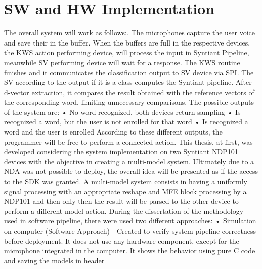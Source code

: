 \chapter{SW and HW Implementation}
\label{cha:software and hardware implementation}
The overall system will work as follows:. The microphones capture the user voice and save their in the buffer. When the buffers are full in the respective devices, the KWS action performing device, will process the input in Syntiant Pipeline, meanwhile SV performing device will wait for a response. The KWS routine finishes and it communicates the classification output to SV device via SPI. The SV according to the output if it is a class computes the Syntiant pipeline. After d-vector extraction, it compares the result obtained with the reference vectors of the corresponding word, limiting unnecessary comparisons.\newline\newline
The possible outputs of the system are:\newline
• No word recognized, both devices return sampling\newline
• Is recognized a word, but the user is not enrolled for that word\newline
• Is recognized a word and the user is enrolled\newline
According to these different outputs, the programmer will be free to perform a connected action.\newline
This thesis, at first, was developed considering the system implementation on two Syntiant NDP101 devices with the objective in creating a multi-model system. Ultimately due to a NDA was not possible to deploy, the overall idea will be presented as if the access to the SDK was granted.
A multi-model system consists in having a uniformly signal processing with an appropriate reshape and MFE block processing by a NDP101 and then only then the result will be parsed to the other device to perform a different model action.
During the dissertation of the methodology used in software pipeline, there were used two different approaches:\newline\newline
• Simulation on computer (Software Approach) - Created to verify system pipeline correctness before deployment. It does not use any hardware component, except for the microphone integrated in the computer. It shows the behavior using pure C code and saving the models in header\newline
